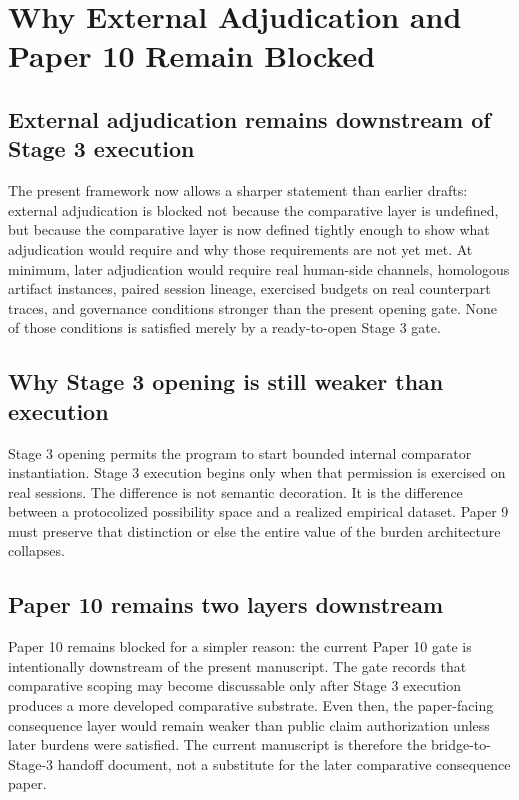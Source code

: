 \documentclass[11pt,a4paper]{article}
\theoremstyle{definition}
\begin{document}
\section{Why External Adjudication and Paper 10 Remain Blocked}
\subsection{External adjudication remains downstream of Stage 3 execution}
The present framework now allows a sharper statement than earlier drafts: external adjudication is blocked not because the comparative layer is undefined, but because the comparative layer is now defined tightly enough to show what adjudication would require and why those requirements are not yet met. At minimum, later adjudication would require real human-side channels, homologous artifact instances, paired session lineage, exercised budgets on real counterpart traces, and governance conditions stronger than the present opening gate. None of those conditions is satisfied merely by a ready-to-open Stage 3 gate.

\subsection{Why Stage 3 opening is still weaker than execution}
Stage 3 opening permits the program to start bounded internal comparator instantiation. Stage 3 execution begins only when that permission is exercised on real sessions. The difference is not semantic decoration. It is the difference between a protocolized possibility space and a realized empirical dataset. Paper 9 must preserve that distinction or else the entire value of the burden architecture collapses.

\subsection{Paper 10 remains two layers downstream}
Paper 10 remains blocked for a simpler reason: the current Paper 10 gate is intentionally downstream of the present manuscript. The gate records that comparative scoping may become discussable only after Stage 3 execution produces a more developed comparative substrate. Even then, the paper-facing consequence layer would remain weaker than public claim authorization unless later burdens were satisfied. The current manuscript is therefore the bridge-to-Stage-3 handoff document, not a substitute for the later comparative consequence paper.
\end{document}
